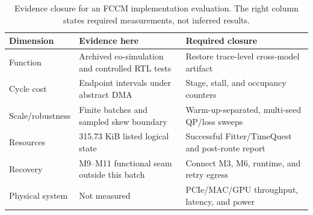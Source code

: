 
\begin{table}[tbp]
  \centering
  \caption{Evidence closure for an FCCM implementation evaluation.  The right
  column states required measurements, not inferred results.}
  \label{tab:eval:evidence-closure}
  \scriptsize
  \begin{tabular}{@{}p{}p{}p{}@{}}
    \toprule
    Dimension & Evidence here & Required closure \\
    \midrule
    Function & Archived co-simulation and controlled RTL tests & Restore trace-level cross-model artifact \\
    Cycle cost & Endpoint intervals under abstract DMA & Stage, stall, and occupancy counters \\
    Scale/robustness & Finite batches and sampled skew boundary & Warm-up-separated, multi-seed QP/loss sweeps \\
    Resources & 315.73 KiB listed logical state & Successful Fitter/TimeQuest and post-route report \\
    Recovery & M9--M11 functional seam outside this batch & Connect M3, M6, runtime, and retry egress \\
    Physical system & Not measured & PCIe/MAC/GPU throughput, latency, and power \\
    \bottomrule
  \end{tabular}
\end{table}

